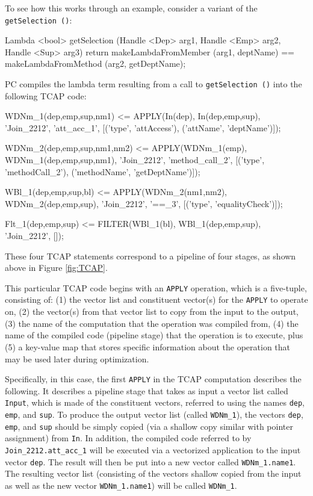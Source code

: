 To see how this works through an example, consider a variant of the \texttt{getSelection ()}:

\begin{codesmall} 
Lambda <bool> getSelection (Handle <Dep> arg1, 
     Handle <Emp> arg2, Handle <Sup> arg3) {
	return makeLambdaFromMember (arg1, deptName) == 
	       makeLambdaFromMethod (arg2, getDeptName);  }
\end{codesmall}

\noindent PC compiles the lambda term resulting from a call to \texttt{getSelection ()} into the following TCAP code:

\begin{codesmall}
WDNm_1(dep,emp,sup,nm1) <= APPLY(In(dep), 
   In(dep,emp,sup), 'Join_2212', 'att_acc_1', 
      [('type', 'attAccess'), ('attName', 'deptName')]);

WDNm_2(dep,emp,sup,nm1,nm2) <= APPLY(WDNm_1(emp), 
   WDNm_1(dep,emp,sup,nm1), 'Join_2212',
      'method_call_2', [('type', 'methodCall_2'), 
          ('methodName', 'getDeptName')]);

WBl_1(dep,emp,sup,bl) <= APPLY(WDNm_2(nm1,nm2),
   WDNm_2(dep,emp,sup), 'Join_2212', '==_3', 
      [('type', 'equalityCheck')]);

Flt_1(dep,emp,sup) <= FILTER(WBl_1(bl), 
   WBl_1(dep,emp,sup), 'Join_2212', []);
\end{codesmall}

\noindent
These four TCAP statements correspond to a pipeline of four stages,
as shown above in Figure \ref{fig:TCAP}.

This particular TCAP code begins with an \texttt{APPLY} operation, which is a five-tuple, consisting of: (1) the vector list and constituent
vector(s) for the \texttt{APPLY} to operate on, (2) the vector(s) from that vector list to copy
from the input to the output, (3) the name of the computation that the operation was compiled from, (4) the name of the compiled code (pipeline stage)
that the operation is to execute, plus (5) a key-value map that stores specific information about the operation that may be used 
later during optimization.

Specifically, in this case, the first \texttt{APPLY} in the TCAP computation describes the following.  It describes a pipeline stage that
takes as input 
a vector list called \texttt{Input}, which is made of the constituent vectors, referred to using 
the names \texttt{dep}, \texttt{emp}, and \texttt{sup}.
To produce the output vector list (called \texttt{WDNm\_1}), the vectors
\texttt{dep}, \texttt{emp}, and \texttt{sup} should be simply copied
(via a shallow copy similar with pointer assignment) from \texttt{In}.
In addition, the compiled code referred to by \texttt{Join\_2212.att\_acc\_1} will be executed via a vectorized application to the input
vector \texttt{dep}.  The result will then be put into a new vector called 
\texttt{WDNm\_1.name1}.
The resulting vector list (consisting of the vectors shallow copied from the input as well as the new vector \texttt{WDNm\_1.name1})
will be called \texttt{WDNm\_1}.  

